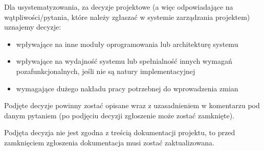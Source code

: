 \documentclass[a4paper]{article}
\begin{document}
Dla usystematyzowania, za decyzje projektowe (a więc odpowiadające na wątpliwości/pytania, które należy zgłaszać w systemie zarządzania projektem) uznajemy decyzje:
\begin{itemize}
	\item wpływające na inne moduły oprogramowania lub architekturę systemu
	\item wpływające na wydajność systemu lub spełnialność innych wymagań pozafunkcjonalnych, jeśli nie są natury implementacyjnej
	\item wymagające dużego nakładu pracy potrzebnej do wprowadzenia zmian
\end{itemize}

Podjęte decyzje powinny zostać opisane wraz z uzasadnieniem w komentarzu pod danym pytaniem (po podjęciu decyzji zgłoszenie może zostać zamknięte).

Podjęta decyzja nie jest zgodna z treścią dokumentacji projektu, to przed zamknięciem zgłoszenia dokumentacja musi zostać zaktualizowana.
\end{document}
